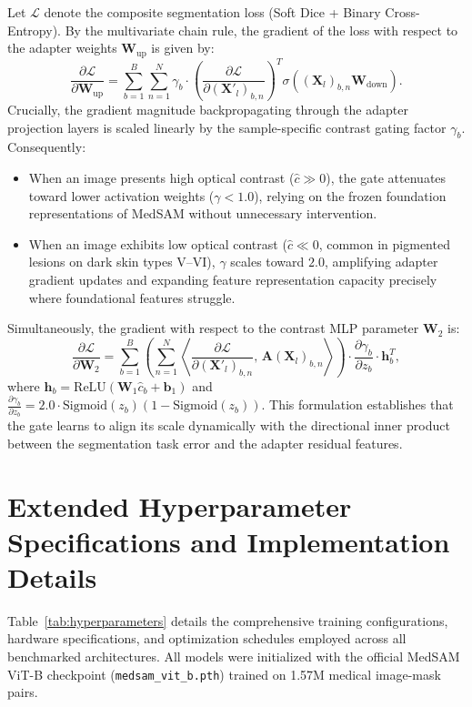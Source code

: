 \documentclass[runningheads]{llncs}
\begin{document}
Let $\mathcal{L}$ denote the composite segmentation loss (Soft Dice + Binary Cross-Entropy). By the multivariate chain rule, the gradient of the loss with respect to the adapter weights $\mathbf{W}_{\text{up}}$ is given by:
\begin{equation}
\frac{\partial \mathcal{L}}{\partial \mathbf{W}_{\text{up}}} = \sum_{b=1}^B \sum_{n=1}^N \gamma_b \cdot \left(\frac{\partial \mathcal{L}}{\partial (\mathbf{X}'_l)_{b,n}}\right)^T \sigma\left((\mathbf{X}_l)_{b,n} \mathbf{W}_{\text{down}}\right).
\end{equation}
Crucially, the gradient magnitude backpropagating through the adapter projection layers is scaled linearly by the sample-specific contrast gating factor $\gamma_b$. Consequently:
\begin{itemize}
    \item When an image presents high optical contrast ($\hat{c} \gg 0$), the gate attenuates toward lower activation weights ($\gamma < 1.0$), relying on the frozen foundation representations of MedSAM without unnecessary intervention.
    \item When an image exhibits low optical contrast ($\hat{c} \ll 0$, common in pigmented lesions on dark skin types V--VI), $\gamma$ scales toward $2.0$, amplifying adapter gradient updates and expanding feature representation capacity precisely where foundational features struggle.
\end{itemize}

Simultaneously, the gradient with respect to the contrast MLP parameter $\mathbf{W}_2$ is:
\begin{equation}
\frac{\partial \mathcal{L}}{\partial \mathbf{W}_2} = \sum_{b=1}^B \left( \sum_{n=1}^N \left\langle \frac{\partial \mathcal{L}}{\partial (\mathbf{X}'_l)_{b,n}},\, \mathbf{A}(\mathbf{X}_l)_{b,n} \right\rangle \right) \cdot \frac{\partial \gamma_b}{\partial z_b} \cdot \mathbf{h}_b^T,
\end{equation}
where $\mathbf{h}_b = \text{ReLU}(\mathbf{W}_1 \hat{c}_b + \mathbf{b}_1)$ and $\frac{\partial \gamma_b}{\partial z_b} = 2.0 \cdot \text{Sigmoid}(z_b)(1 - \text{Sigmoid}(z_b))$. This formulation establishes that the gate learns to align its scale dynamically with the directional inner product between the segmentation task error and the adapter residual features.

\section{Extended Hyperparameter Specifications and Implementation Details}
\label{sec:hyperparameters}
Table~\ref{tab:hyperparameters} details the comprehensive training configurations, hardware specifications, and optimization schedules employed across all benchmarked architectures. All models were initialized with the official MedSAM ViT-B checkpoint (\texttt{medsam\_vit\_b.pth}) trained on 1.57M medical image-mask pairs.
\end{document}
